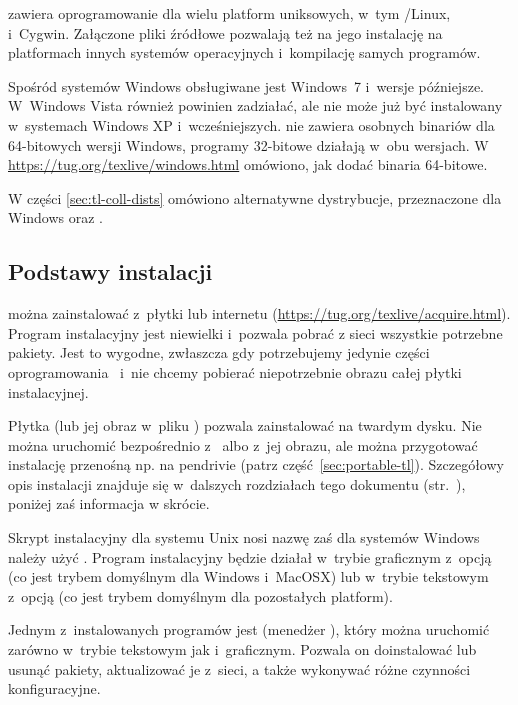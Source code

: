 \documentclass{article}
\begin{document}
\TL{} zawiera oprogramowanie dla wielu platform uniksowych,
w~tym \GNU/Linux, \MacOSX i~Cyg\-win. Załączone pliki źródłowe pozwalają też
na jego instalację na platformach innych systemów operacyjnych i~kompilację
samych programów.

Spośród systemów Windows obsługiwane jest Windows~7 i~wersje
późniejsze. W~Windows Vista  również powinien
zadziałać, ale \TL{} nie może już być instalowany w~systemach Windows XP i~wcześniejszych.
\TL{} nie zawiera osobnych binariów dla 64-bitowych wersji Windows, programy 32-bitowe
działają w~obu wersjach.  W \url{https://tug.org/texlive/windows.html} omówiono, jak
dodać binaria 64-bitowe.

W części \ref{sec:tl-coll-dists} omówiono alternatywne dystrybucje,
przeznaczone dla Windows oraz \MacOSX.

\subsection{Podstawy instalacji \protect\TL{}}
\label{sec:basic}

\TL{} można zainstalować z~płytki \DVD{} lub internetu
(\url{https://tug.org/texlive/acquire.html}). Program instalacyjny
jest niewielki i~pozwala pobrać z sieci wszystkie potrzebne pakiety.
Jest to wygodne, zwłaszcza gdy potrzebujemy jedynie części oprogramowania
\TL\ i~nie chcemy pobierać niepotrzebnie obrazu całej płytki instalacyjnej.

Płytka \DVD{}  (lub jej obraz w~pliku )  pozwala
zainstalować \TL{} na twardym dysku. Nie można uruchomić \TL{} bezpośrednio z~\TK{} \DVD{} albo z~jej obrazu, ale  można  przygotować instalację przenośną  np. na pendrivie
(patrz część~\ref{sec:portable-tl}).
Szczegółowy opis instalacji \TL{} znajduje się w~dalszych rozdziałach
tego dokumentu (str.~\pageref{sec:install}), poniżej zaś informacja w skrócie.

\begin{itemize*}
\item Skrypt instalacyjny dla systemu Unix nosi nazwę  zaś dla systemów Windows
należy użyć . Program instalacyjny będzie działał w~trybie graficznym
z~opcją  (co jest trybem domyślnym dla Windows i~MacOSX) lub w~trybie tekstowym z~opcją
 (co jest trybem domyślnym dla pozostałych platform).

\item Jednym z~instalowanych programów jest  (menedżer \TL{}),
który  można uruchomić zarówno w~trybie tekstowym jak i~graficznym. Pozwala
on doinstalować lub usunąć pakiety, aktualizować je z~sieci, a także
wykonywać różne czynności konfiguracyjne.

\end{itemize*}
\end{document}
